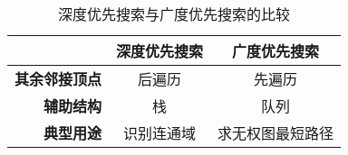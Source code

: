 


\begin{frame}
    \frametitle{\insertsectionhead}
    \begin{table}
        \centering\small
        \caption{深度优先搜索与广度优先搜索的比较}
        \label{tab:dfs_vs_bfs}
        \begin{tabular}{rcc}
            \toprule
                            & \textbf{深度优先搜索} & \textbf{广度优先搜索} \\
            \midrule
            \textbf{其余邻接顶点} & 后遍历             & 先遍历             \\
            \textbf{辅助结构}   & 栈               & 队列              \\
            \textbf{典型用途}   & 识别连通域           & 求无权图最短路径        \\
            \bottomrule
        \end{tabular}
    \end{table}
\end{frame}